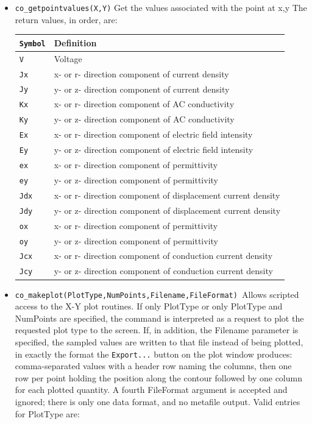 \begin{itemize}
Returns a value that can be complex, as necessary.

\item \texttt{co\_getpointvalues(X,Y)} Get the values associated with the point at x,y
The return values, in order, are:

\begin{tabular}{ll}
\texttt{Symbol} &  Definition \\ \hline
\texttt{V} & Voltage \\
\texttt{Jx} & x- or r- direction component of current density \\
\texttt{Jy} & y- or z- direction component of current density \\
\texttt{Kx} & x- or r- direction component of AC conductivity \\
\texttt{Ky} & y- or z- direction component of AC conductivity \\
\texttt{Ex} & x- or r- direction component of electric field intensity \\
\texttt{Ey} & y- or z- direction component of electric field intensity \\
\texttt{ex} & x- or r- direction component of permittivity \\
\texttt{ey} & y- or z- direction component of permittivity \\
\texttt{Jdx} & x- or r- direction component of displacement current density \\
\texttt{Jdy} & y- or z- direction component of displacement current density \\
\texttt{ox} & x- or r- direction component of permittivity \\
\texttt{oy} & y- or z- direction component of permittivity \\
\texttt{Jcx} & x- or r- direction component of conduction current density \\
\texttt{Jcy} & y- or z- direction component of conduction current density \\
\end{tabular}

\item \texttt{co\_makeplot(PlotType,NumPoints,Filename,FileFormat) }Allows scripted access
to the X-Y plot routines. If only PlotType or only PlotType and NumPoints
are specified, the command is interpreted as a request to plot the requested
plot type to the screen. If, in addition, the Filename parameter is
specified, the sampled values are written to that file instead of being
plotted, in exactly the format the \texttt{Export...} button on the plot
window produces: comma-separated values with a header row naming the columns,
then one row per point holding the position along the contour followed by one
column for each plotted quantity. A fourth FileFormat argument is accepted and
ignored; there is only one data format, and no metafile output. Valid entries
for PlotType are:


\end{itemize}
